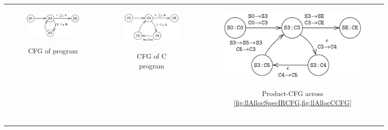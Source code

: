 \begin{figure}[t]
\begin{tabular}{ccc}
\begin{subfigure}[b]{0.27\textwidth}
\begin{center}
{\includegraphics[scale=0.87]{figMallocSpecCfg.pdf}}
\vspace{12pt}
\end{center}
\caption{\label{fig:llAllocSpecIRCFG}CFG of \SpecL{} program}
\end{subfigure}%
&
\begin{subfigure}[b]{0.27\textwidth}
\begin{center}
{\includegraphics[scale=0.87]{figMallocCCfg.pdf}}
\vspace{1pt}
\end{center}
\caption{\label{fig:llAllocCCFG}CFG of C program}
\end{subfigure}%
&
\begin{subfigure}[b]{0.40\textwidth}
\begin{center}
{\includegraphics[scale=0.84]{figMallocProductCfg.pdf}}
\end{center}
\caption{\label{fig:llAllocProductCFG}Product-CFG across \cref{fig:llAllocSpecIRCFG,fig:llAllocCCFG}}
\end{subfigure}%
\\
\multicolumn{3}{c}{
\begin{subfigure}[b]{1.0\textwidth}

\end{subfigure}}
\end{tabular}
\end{figure}
